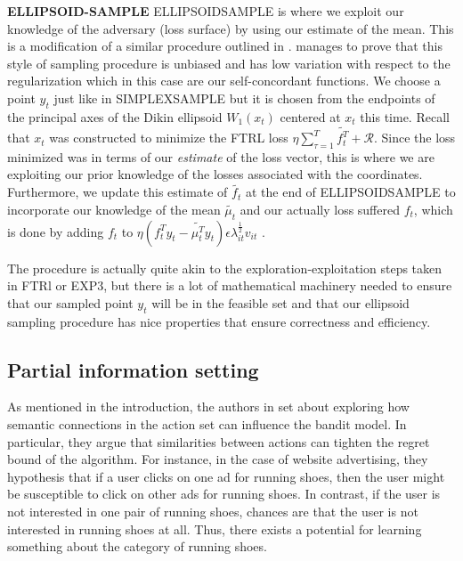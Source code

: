 \textbf{ELLIPSOID-SAMPLE}
ELLIPSOIDSAMPLE is where we exploit our knowledge of the adversary (loss surface) by using our estimate of the mean. This is a modification of a similar procedure outlined in \citep{abernethy}. \citep{abernethy} manages to  prove that this style of sampling procedure is unbiased and has low variation with respect to the regularization which in this case are our self-concordant functions. We choose a point $y_t$ just like in SIMPLEXSAMPLE but it is  chosen from the endpoints of the principal axes of the Dikin ellipsoid $W_1(x_t)$ centered at $x_t$ this time. Recall that $x_t$ was constructed to minimize the FTRL loss $\eta \sum_{\tau=1}^T\tilde{f_t^T} +\mathcal{R}$. Since the loss minimized was in terms of our \textit{estimate} of the loss vector, this is where we are exploiting our prior knowledge of the losses associated with the coordinates. Furthermore, we update this estimate of $\tilde{f_t}$ at the end of ELLIPSOIDSAMPLE to incorporate our knowledge of the mean $\tilde{\mu_t}$ and our actually loss suffered $f_t$, which is done by adding $f_t$ to  $\eta (f_{t}^Ty_t - \tilde{\mu_{t}^T}y_t)\epsilon \lambda_{it}^{\frac{1}{2}}v_{it}$ .

The procedure is actually quite akin to the exploration-exploitation steps taken in FTRl or EXP3, but there is a lot of mathematical machinery needed to ensure that our sampled point $y_t$ will be in the feasible set and that our ellipsoid sampling procedure has nice properties that ensure correctness and efficiency. 


\subsection{Partial information setting}
As mentioned in the introduction, the authors in \citep{alon} set about exploring how semantic connections in the action set can influence the bandit model. In particular, they argue that similarities between actions can tighten the regret bound of the algorithm. For instance, in the case of website advertising, they hypothesis that if a user clicks on one ad for running shoes, then the user might be susceptible to click on other ads for running shoes. In contrast, if the user is not interested in one pair of running shoes, chances are that the user is not interested in running shoes at all. Thus, there exists a potential for learning something about the category of running shoes. 

